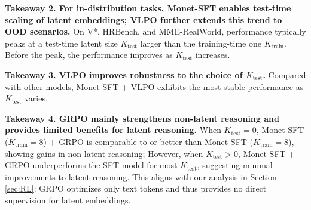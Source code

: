 \textbf{Takeaway 2. For in-distribution tasks, Monet-SFT enables test-time scaling of latent embeddings; VLPO further extends this trend to OOD scenarios.} On V*, HRBench, and MME-RealWorld, performance typically peaks at a test-time latent size $K_{\text{test}}$ larger than the training-time one $K_{\text{train}}$. Before the peak, the performance improves as $K_{\text{test}}$ increases. 


\textbf{Takeaway 3. VLPO improves robustness to the choice of $K_{\text{test}}$.} Compared with other models, Monet-SFT + VLPO exhibits the most stable performance as $K_{\text{test}}$ varies.

\textbf{Takeaway 4. GRPO mainly strengthens non-latent reasoning and provides limited benefits for latent reasoning.} When $K_{\text{test}}=0$, Monet-SFT ($K_{\text{train}}=8$) + GRPO is comparable to or better than Monet-SFT ($K_{\text{train}}=8$), showing gains in non-latent reasoning; However, when $K_{\text{test}}>0$, Monet-SFT + GRPO underperforms the SFT model for most $K_{\text{test}}$, suggesting minimal improvements to latent reasoning. This aligns with our analysis in Section \ref{sec:RL}: GRPO optimizes only text tokens and thus provides no direct supervision for latent embeddings.